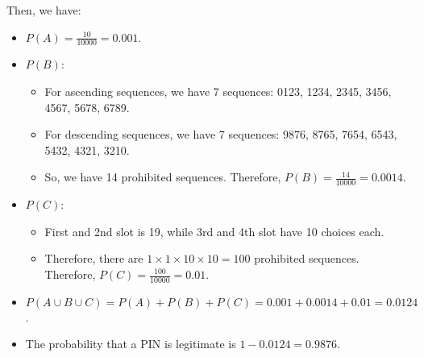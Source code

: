 Then, we have:
\begin{itemize}
    \item \(P(A) = \frac{10}{10000} = 0.001\).
    \item \(P(B)\):
          \begin{itemize}
              \item For ascending sequences, we have 7 sequences: 0123, 1234, 2345, 3456, 4567, 5678, 6789.
              \item For descending sequences, we have 7 sequences: 9876, 8765, 7654, 6543, 5432, 4321, 3210.
              \item So, we have 14 prohibited sequences. Therefore, \(P(B) = \frac{14}{10000} = 0.0014\).
          \end{itemize}
    \item \(P(C)\):
          \begin{itemize}
              \item First and 2nd slot is 19, while 3rd and 4th slot have 10 choices each.
              \item Therefore, there are \(1 \times 1 \times 10 \times 10 = 100\) prohibited sequences. Therefore, \(P(C) = \frac{100}{10000} = 0.01\).
          \end{itemize}

    \item \(P(A \cup B \cup C) = P(A) + P(B) + P(C) = 0.001 + 0.0014 + 0.01 = 0.0124\).
    \item The probability that a PIN is legitimate is \(1 - 0.0124 = 0.9876\).
\end{itemize}